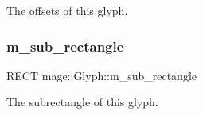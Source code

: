 The offsets of this glyph. \hypertarget{structmage_1_1_glyph_ac990dc92b5eebcc99da599f1a8d15bb4}{}\label{structmage_1_1_glyph_ac990dc92b5eebcc99da599f1a8d15bb4} 
\subsubsection{\texorpdfstring{m\+\_\+sub\+\_\+rectangle}{m\_sub\_rectangle}}
{\footnotesize\ttfamily R\+E\+CT mage\+::\+Glyph\+::m\+\_\+sub\+\_\+rectangle}

The subrectangle of this glyph. 